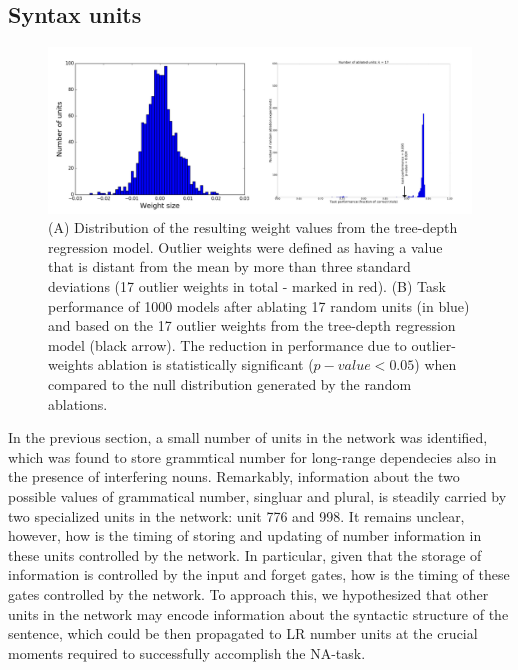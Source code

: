 \subsection{Syntax units}
\begin{figure}[b]
\centering
\includegraphics[width=\linewidth]{Figures/Figure6_regression.png}
\caption{(A) Distribution of the resulting weight values from the tree-depth regression model. Outlier weights were defined as having a value that is distant from the mean by more than three standard deviations (17 outlier weights in total - marked in red). (B) Task performance of 1000 models after ablating 17 random units (in blue) and based on the 17 outlier weights from the tree-depth regression model (black arrow). The reduction in performance due to outlier-weights ablation is statistically significant ($p-value < 0.05$) when compared to the null distribution generated by the random ablations.}
\end{figure}

In the previous section, a small number of units in the network was identified, which was found to store grammtical number for long-range dependecies also in the presence of interfering nouns. Remarkably, information about the two possible values of grammatical number, singluar and plural, is steadily carried by two specialized units in the network: unit 776 and 998. It remains unclear, however, how is the timing of storing and updating of number information in these units controlled by the network. In particular, given that the storage of information is controlled by the input and forget gates, how is the timing of these gates controlled by the network. To approach this, we hypothesized that other units in the network may encode information about the syntactic structure of the sentence, which could be then propagated to LR number units at the crucial moments required to successfully accomplish the NA-task. 

